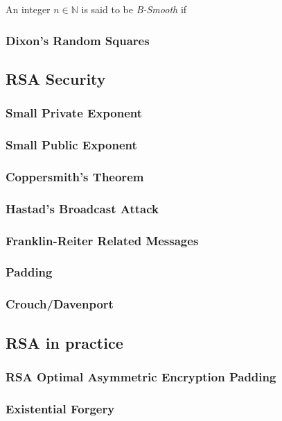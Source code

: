 \begin{definition}
    An integer $n \in \mathbb{N}$ is said to be \textit{B-Smooth} if
\end{definition}

\begin{example}
\end{example}
\subsubsection{Dixon’s Random Squares}

\subsection{RSA Security}
\subsubsection{Small Private Exponent}
\subsubsection{Small Public Exponent}
\subsubsection{Coppersmith’s Theorem}
\subsubsection{Hastad’s Broadcast Attack}
\subsubsection{Franklin-Reiter Related Messages}
\subsubsection{Padding}
\subsubsection{Crouch/Davenport}

\subsection{RSA in practice}
\subsubsection{RSA Optimal Asymmetric Encryption Padding}
\subsubsection{Existential Forgery}
